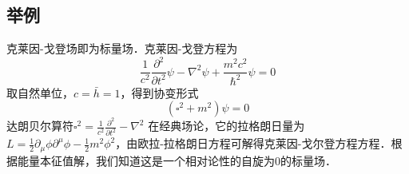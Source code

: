 \subsection{举例}
克莱因-戈登场即为标量场．克莱因-戈登方程为
\begin{equation}
\frac{1}{c^{2}} \frac{\partial^{2}}{\partial t^{2}} \psi-\nabla^{2} \psi+\frac{m^{2} c^{2}}{\hbar^{2}} \psi=0
\end{equation}
取自然单位，$c=\bar{h}=1$，得到协变形式
\begin{equation}
\left(\square^{2}+m^{2}\right) \psi=0
\end{equation}
达朗贝尔算符$\square^{2}=\frac{1}{c^{2}} \frac{\partial^{2}}{\partial t^{2}}-\nabla^{2}$
在经典场论，它的拉格朗日量为$L=\frac{1}{2} \partial_{\mu} \phi \partial^{\mu} \phi-\frac{1}{2} m^{2} \phi^{2}$，由欧拉-拉格朗日方程可解得克莱因-戈尔登方程方程．根据能量本征值解，我们知道这是一个相对论性的自旋为0的标量场．
